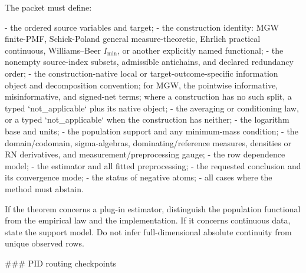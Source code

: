\documentclass[11pt]{article}
\begin{document}
\begin{markdown}
The packet must define:

- the ordered source variables and target;
- the construction identity: MGW finite-PMF, Schick-Poland general measure-theoretic, Ehrlich
  practical continuous, Williams--Beer $I_{\min}$, or another explicitly named functional;
- the nonempty source-index subsets, admissible antichains, and declared redundancy order;
- the construction-native local or target-outcome-specific information object and decomposition
  convention; for MGW, the pointwise informative, misinformative, and signed-net terms; where a
  construction has no such split, a typed `not_applicable` plus its native object;
- the averaging or conditioning law, or a typed `not_applicable` when the construction has neither;
- the logarithm base and units;
- the population support and any minimum-mass condition;
- the domain/codomain, sigma-algebras, dominating/reference measures, densities or RN derivatives,
  and measurement/preprocessing gauge;
- the row dependence model;
- the estimator and all fitted preprocessing;
- the requested conclusion and its convergence mode;
- the status of negative atoms;
- all cases where the method must abstain.

If the theorem concerns a plug-in estimator, distinguish the population functional from the
empirical law and the implementation. If it concerns continuous data, state the support model. Do
not infer full-dimensional absolute continuity from unique observed rows.

### PID routing checkpoints


\end{markdown}
\end{document}
